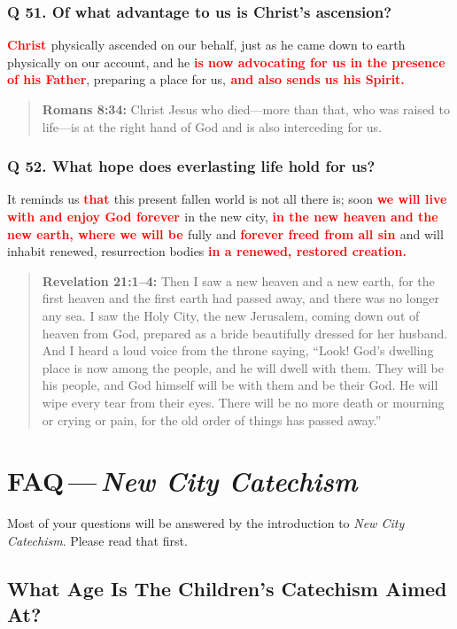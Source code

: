 \documentclass[]{memoir}
\newcommand\Children[1]{\textbf{\textcolor{red}{#1}}}
\newcommand\Quote[2]{\begin{quote}{\textbf{#1:}{ #2}}\end{quote}}
\begin{document}
\subsection{Q 51. Of what advantage to us is Christ's ascension?}
\Children{Christ }physically ascended on our behalf, just as he came down to earth physically on our account, and he \Children{is now advocating for us in the presence of his Father}, preparing a place for us,\Children{ and also sends us his Spirit.}

\Quote{Romans 8:34}{Christ Jesus who died\thinspace{}---\thinspace{}more than that, who was raised to life\thinspace{}---\thinspace{}is at the right hand of God and is also interceding for us.}

\subsection{Q 52. What hope does everlasting life hold for us?}
It reminds us \Children{that }this present fallen world is not all there is; soon \Children{we will live with and enjoy God forever }in the new city, \Children{in the new heaven and the new earth, where we will be }fully and \Children{forever freed from all sin }and will inhabit renewed, resurrection bodies \Children{in a renewed, restored creation.}

\Quote{Revelation 21:1--4}{Then I saw a new heaven and a new earth, for the first heaven and the first earth had passed away, and there was no longer any sea. I saw the Holy City, the new Jerusalem, coming down out of heaven from God, prepared as a bride beautifully dressed for her husband. And I heard a loud voice from the throne saying, ``Look! God's dwelling place is now among the people, and he will dwell with them. They will be his people, and God himself will be with them and be their God. He will wipe every tear from their eyes. There will be no more death or mourning or crying or pain, for the old order of things has passed away.''}


\bigskip

\chapter{FAQ\,---\,{\em New City Catechism}}

Most of your questions will be answered by the introduction to \emph{New City Catechism}. Please read that first.

\section[What Age Is The Children's Catechism Aimed At?][Catechism For What Age Children?]{What Age Is The Children's Catechism Aimed At?}
\end{document}

